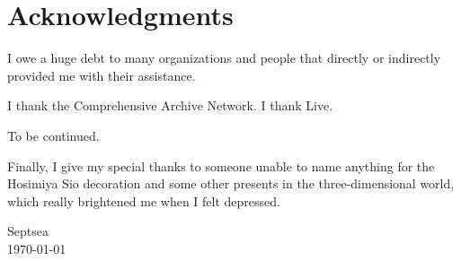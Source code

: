 \chapter{Acknowledgments}

I owe a huge debt
to many organizations and people
that directly or indirectly provided me
with their assistance.

I thank the Comprehensive  Archive Network.
I thank  Live.

To be continued.

Finally, I give my special thanks to someone
unable to name anything
for the Hosimiya Sio decoration
and some other presents in the three-dimensional world,
which really brightened me when I felt depressed.

\begin{flushright}
    Septsea\\
    \today
\end{flushright}
